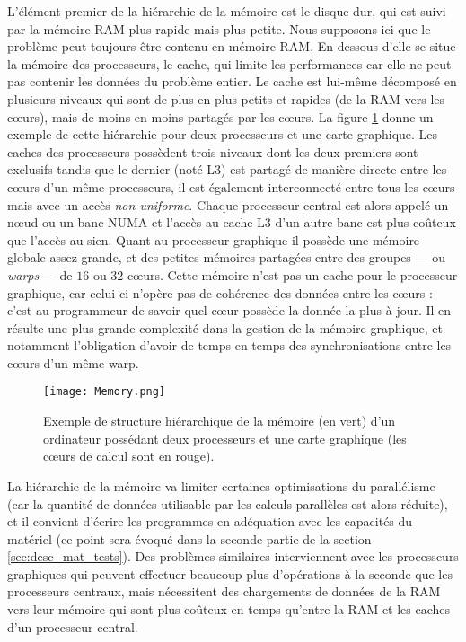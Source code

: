 L'élément premier de la hiérarchie de la mémoire est le disque dur, qui est suivi par la mémoire RAM plus rapide mais plus petite. Nous supposons ici que le problème peut toujours être contenu en mémoire RAM. En-dessous d'elle se situe la mémoire des processeurs, le cache, qui limite les performances car elle ne peut pas contenir les données du problème entier. Le cache est lui-même décomposé en plusieurs niveaux qui sont de plus en plus petits et rapides (de la RAM vers les cœurs), mais de moins en moins partagés par les cœurs. La figure \ref{fig:memoire_base} donne un exemple de cette hiérarchie pour deux processeurs et une carte graphique. Les caches des processeurs possèdent trois niveaux dont les deux premiers sont exclusifs tandis que le dernier (noté L3) est partagé de manière directe entre les cœurs d'un même processeurs, il est également interconnecté entre tous les cœurs mais avec un accès \emph{non-uniforme}. Chaque processeur central est alors appelé un nœud ou un banc NUMA et l'accès au cache L3 d'un autre banc est plus coûteux que l'accès au sien. Quant au processeur graphique il possède une mémoire globale assez grande, et des petites mémoires partagées entre des groupes --- ou \emph{warps} --- de $16$ ou $32$ cœurs. Cette mémoire n'est pas un cache pour le processeur graphique, car celui-ci n'opère pas de cohérence des données entre les cœurs : c'est au programmeur de savoir quel cœur possède la donnée la plus à jour. Il en résulte une plus grande complexité dans la gestion de la mémoire graphique, et notamment l'obligation d'avoir de temps en temps des synchronisations entre les cœurs d'un même warp. 

\begin{figure}[!h]
  \caption{Exemple de structure hiérarchique de la mémoire (en vert) d'un ordinateur possédant deux processeurs et une carte graphique (les cœurs de calcul sont en rouge).}
  \label{fig:memoire_base}
  \texttt{[image: Memory.png]}
\end{figure}

La hiérarchie de la mémoire va limiter certaines optimisations du parallélisme (car la quantité de données utilisable par les calculs parallèles est alors réduite), et il convient d'écrire les programmes en adéquation avec les capacités du matériel (ce point sera évoqué dans la seconde partie de la section \ref{sec:desc_mat_tests}). Des problèmes similaires interviennent avec les processeurs graphiques qui peuvent effectuer beaucoup plus d'opérations à la seconde que les processeurs centraux, mais nécessitent des chargements de données de la RAM vers leur mémoire qui sont plus coûteux en temps qu'entre la RAM et les caches d'un processeur central.

